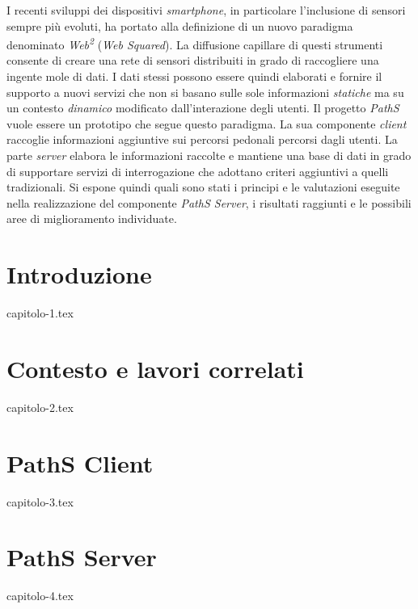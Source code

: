 \documentclass[a4paper, 12pt, twoside, openright]{book}
\newenvironment{abstract}{\cleardoublepage \null \vfill \begin{center}\bfseries\abstractname \end{center}}{\vfill\null}
\begin{document}
\begin{abstract} %
\markboth{}{} %
\thispagestyle{empty}
I recenti sviluppi dei dispositivi \emph{smartphone}, in particolare l'inclusione di sensori sempre più evoluti, ha portato alla definizione di un nuovo paradigma denominato \emph{Web\textsuperscript{2}} (\emph{Web Squared}). La diffusione capillare di questi strumenti consente di creare una rete di sensori distribuiti in grado di raccogliere una ingente mole di dati. I dati stessi possono essere quindi elaborati e fornire il supporto a nuovi servizi che non si basano sulle sole informazioni \emph{statiche} ma su un contesto \emph{dinamico} modificato dall'interazione degli utenti. Il progetto \emph{PathS} vuole essere un prototipo che segue questo paradigma. La sua componente \emph{client} raccoglie informazioni aggiuntive sui percorsi pedonali percorsi dagli utenti. La parte \emph{server} elabora le informazioni raccolte e mantiene una base di dati in grado di supportare servizi di interrogazione che adottano criteri aggiuntivi a quelli tradizionali.
Si espone quindi quali sono stati i principi e le valutazioni eseguite nella realizzazione del componente \emph{PathS Server}, i risultati raggiunti e le possibili aree di miglioramento individuate.
\end{abstract}


\mainmatter

\chapter{Introduzione} %
\thispagestyle{empty}
{capitolo-1.tex}

\chapter{Contesto e lavori correlati} %
\thispagestyle{empty}
{capitolo-2.tex}

\chapter{PathS Client} %
\thispagestyle{empty}
{capitolo-3.tex}

\chapter{PathS Server} %
\thispagestyle{empty}
{capitolo-4.tex}
\end{document}
